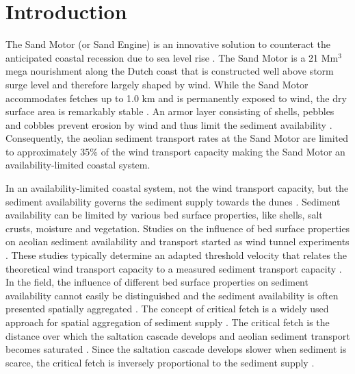 \section{Introduction}

The Sand Motor (or Sand Engine) is an innovative solution to
counteract the anticipated coastal recession due to sea level rise
\citep{Stive2013}. The Sand Motor is a 21 $\mathrm{Mm^3}$ mega
nourishment along the Dutch coast that is constructed well above storm
surge level and therefore largely shaped by wind. While the Sand Motor
accommodates fetches up to 1.0 km and is permanently exposed to wind,
the dry surface area is remarkably stable \citep{Hoonhout2017a}. An
armor layer consisting of shells, pebbles and cobbles prevent erosion
by wind and thus limit the sediment availability \citep[following the
definition of][]{Kocurek1999}. Consequently, the aeolian sediment
transport rates at the Sand Motor are limited to approximately 35\% of
the wind transport capacity \citep{Hoonhout2017a} making the Sand
Motor an availability-limited coastal system.

In an availability-limited coastal system, not the wind transport
capacity, but the sediment availability governs the sediment supply
towards the dunes \citep{Houser2013}. Sediment availability can be
limited by various bed surface properties, like shells, salt crusts,
moisture and vegetation. Studies on the influence of bed surface
properties on aeolian sediment availability and transport started as
wind tunnel experiments \citep[e.g.][]{Belly1964, Howard1977,
  Dyer1986, Gillette1989}. These studies typically determine an
adapted threshold velocity that relates the theoretical wind transport
capacity to a measured sediment transport capacity
\citep{Bagnold1937b}. In the field, the influence of different bed
surface properties on sediment availability cannot easily be
distinguished and the sediment availability is often presented
spatially aggregated \citep{Jackson1998, Arens2001, Wiggs2004}. The
concept of critical fetch is a widely used approach for spatial
aggregation of sediment supply \citep[e.g.][]{Jackson1999,
  DavidsonArnott2005, DavidsonArnott2008, Bauer2009}. The critical
fetch is the distance over which the saltation cascade develops and
aeolian sediment transport becomes saturated \citep{Bauer2002}. Since
the saltation cascade develops slower when sediment is scarce, the
critical fetch is inversely proportional to the sediment supply
\citep{DelgadoFernandez2010}.

